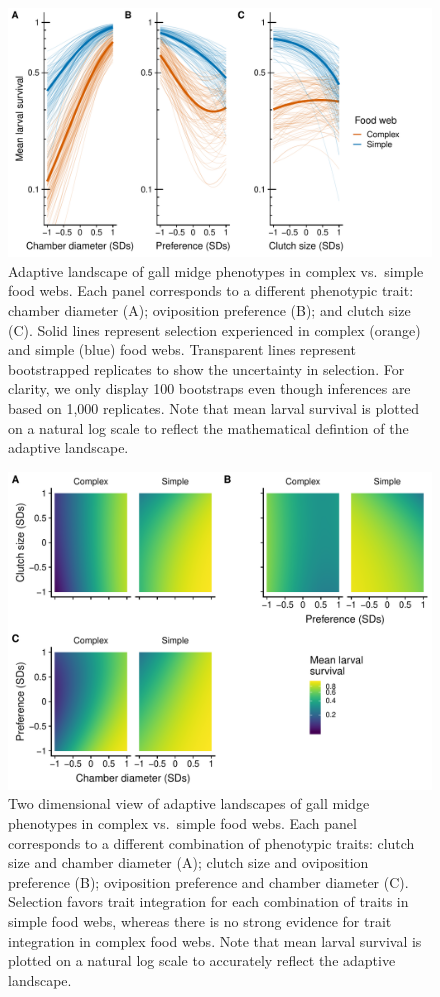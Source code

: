 \documentclass[11pt,]{article}
\begin{document}
\begin{figure}
\centering
\includegraphics{analyses/UV_landscapes.pdf}
\caption{\label{fig:UV_Landscape}Adaptive landscape of gall midge
phenotypes in complex vs.~simple food webs. Each panel corresponds to a
different phenotypic trait: chamber diameter (A); oviposition preference
(B); and clutch size (C). Solid lines represent selection experienced in
complex (orange) and simple (blue) food webs. Transparent lines
represent bootstrapped replicates to show the uncertainty in selection.
For clarity, we only display 100 bootstraps even though inferences are
based on 1,000 replicates. Note that mean larval survival is plotted on
a natural log scale to reflect the mathematical defintion of the
adaptive landscape.}
\end{figure}

\begin{figure}
\centering
\includegraphics{analyses/MV_landscapes.pdf}
\caption{\label{fig:MV_Landscape}Two dimensional view of adaptive
landscapes of gall midge phenotypes in complex vs.~simple food webs.
Each panel corresponds to a different combination of phenotypic traits:
clutch size and chamber diameter (A); clutch size and oviposition
preference (B); oviposition preference and chamber diameter (C).
Selection favors trait integration for each combination of traits in
simple food webs, whereas there is no strong evidence for trait
integration in complex food webs. Note that mean larval survival is
plotted on a natural log scale to accurately reflect the adaptive
landscape.}
\end{figure}
\end{document}
